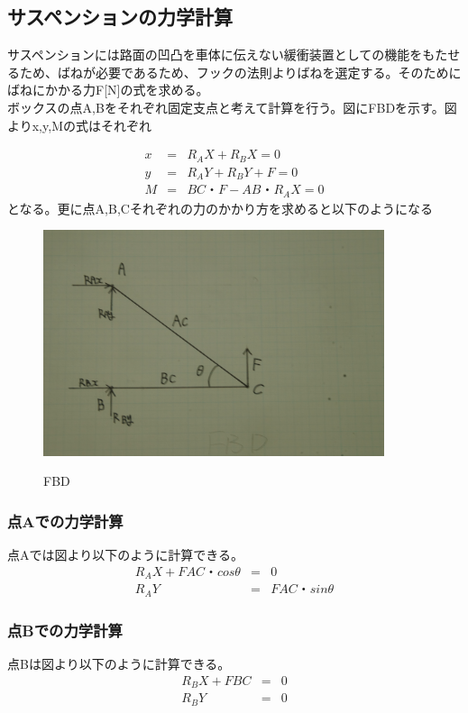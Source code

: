 \documentclass[11pt]{jsarticle}
\begin{document}
\subsection{サスペンションの力学計算}
サスペンションには路面の凹凸を車体に伝えない緩衝装置としての機能をもたせるため、ばねが必要であるため、フックの法則よりばねを選定する。そのためにばねにかかる力F[N]の式を求める。　\\
ボックスの点A,Bをそれぞれ固定支点と考えて計算を行う。図にFBDを示す。図よりx,y,Mの式はそれぞれ

\begin{eqnarray}
	x & = & R_AX+R_BX=0 \\
	y & = & R_AY+R_BY+F=0 \\
	M & = & BC・F-AB・R_AX=0
\end{eqnarray}
となる。更に点A,B,Cそれぞれの力のかかり方を求めると以下のようになる

\begin{figure}[htbt]
 \begin{center}
  \includegraphics[width=100mm]{fbd.jpg}
 　\caption{FBD}
  \label{fig:fbd}%
 \end{center}
\end{figure}

\subsubsection{点Aでの力学計算}
点Aでは図より以下のように計算できる。
\begin{eqnarray}
	R_AX+FAC・cosθ & = & 0 \\
	R_AY & = & FAC・sinθ 
\end{eqnarray}


\subsubsection{点Bでの力学計算}
点Bは図より以下のように計算できる。
\begin{eqnarray}
	R_BX+FBC & = & 0 \\
	R_BY & = & 0
\end{eqnarray}
\end{document}
